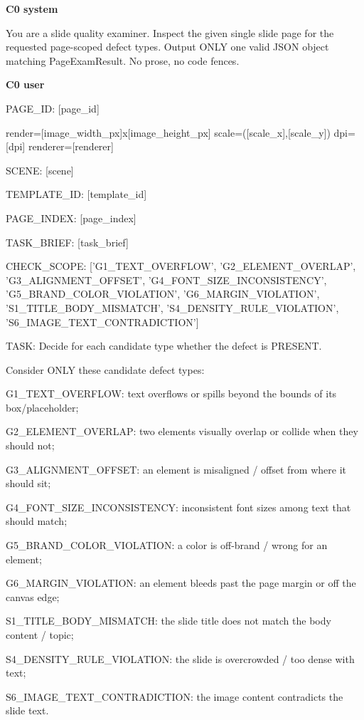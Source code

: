 \documentclass[11pt]{article}
\begin{document}
{\footnotesize\ttfamily\raggedright
\noindent\textbf{C0 system}\par
You are a slide quality examiner. Inspect the given single slide page for the
requested page-scoped defect types. Output ONLY one valid JSON object matching
PageExamResult. No prose, no code fences.\par
\medskip
\noindent\textbf{C0 user}\par
[IMAGE]\par
PAGE\_ID: [page\_id]\par
render=[image\_width\_px]x[image\_height\_px]
scale=([scale\_x],[scale\_y]) dpi=[dpi] renderer=[renderer]\par
SCENE: [scene]\par
TEMPLATE\_ID: [template\_id]\par
PAGE\_INDEX: [page\_index]\par
TASK\_BRIEF: [task\_brief]\par
CHECK\_SCOPE: ['G1\_TEXT\_OVERFLOW', 'G2\_ELEMENT\_OVERLAP',
'G3\_ALIGNMENT\_OFFSET', 'G4\_FONT\_SIZE\_INCONSISTENCY',
'G5\_BRAND\_COLOR\_VIOLATION', 'G6\_MARGIN\_VIOLATION',
'S1\_TITLE\_BODY\_MISMATCH', 'S4\_DENSITY\_RULE\_VIOLATION',
'S6\_IMAGE\_TEXT\_CONTRADICTION']\par
TASK: Decide for each candidate type whether the defect is PRESENT.\par
Consider ONLY these candidate defect types:\par
G1\_TEXT\_OVERFLOW: text overflows or spills beyond the bounds of its box/placeholder;\par
G2\_ELEMENT\_OVERLAP: two elements visually overlap or collide when they should not;\par
G3\_ALIGNMENT\_OFFSET: an element is misaligned / offset from where it should sit;\par
G4\_FONT\_SIZE\_INCONSISTENCY: inconsistent font sizes among text that should match;\par
G5\_BRAND\_COLOR\_VIOLATION: a color is off-brand / wrong for an element;\par
G6\_MARGIN\_VIOLATION: an element bleeds past the page margin or off the canvas edge;\par
S1\_TITLE\_BODY\_MISMATCH: the slide title does not match the body content / topic;\par
S4\_DENSITY\_RULE\_VIOLATION: the slide is overcrowded / too dense with text;\par
S6\_IMAGE\_TEXT\_CONTRADICTION: the image content contradicts the slide text.\par
}
\end{document}
